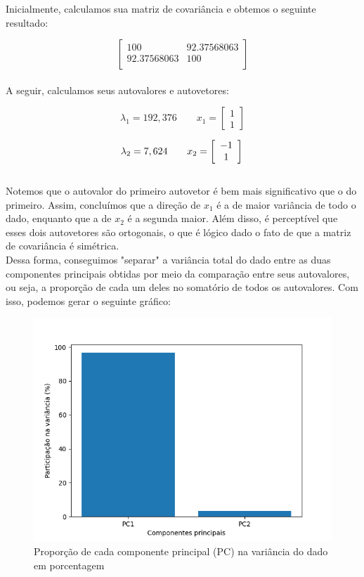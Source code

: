 \documentclass{article}
\begin{document}
Inicialmente, calculamos sua matriz de covariância e obtemos o seguinte resultado:

\[
\left[ {\begin{array}{cc}
    100 & 92.37568063 \\
    92.37568063 & 100 \\
\end{array}} \right]
\]
\\

A seguir, calculamos seus autovalores e autovetores:

\begin{equation*}
    \lambda_1 = 192,376
    \qquad
    x_1 =
    \left[
    \begin{array}{c}
         1 \\
         1
    \end{array}
    \right]
\end{equation*}
    
\begin{equation*}
    \lambda_2 = 7,624
    \qquad
    x_2 =
    \left[
    \begin{array}{c}
         -1 \\
         1
    \end{array}
    \right] \\
\end{equation*}
\\

Notemos que o autovalor do primeiro autovetor é bem mais significativo que o do primeiro. Assim, concluímos que a direção de $x_1$ é a de maior variância de todo o dado, enquanto que a de $x_2$ é a segunda maior. Além disso, é perceptível que esses dois autovetores são ortogonais, o que é lógico dado o fato de que a matriz de covariância é simétrica. \\

Dessa forma, conseguimos "separar" a variância total do dado entre as duas componentes principais obtidas por meio da comparação entre seus autovalores, ou seja, a proporção de cada um deles no somatório de todos os autovalores. Com isso, podemos gerar o seguinte gráfico:

\begin{figure}[h!]
    \centering
    \includegraphics[width=0.4\linewidth]{Figure_5.png}
    \caption{Proporção de cada componente principal (PC) na variância do dado em porcentagem}
    \label{fig:enter-label}
\end{figure}
\end{document}
